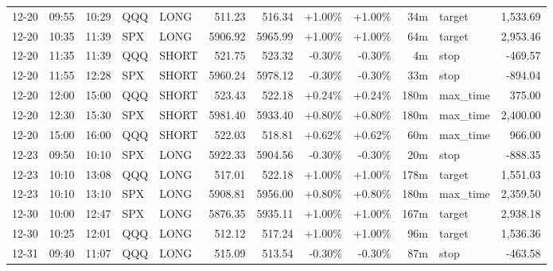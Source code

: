 \documentclass[11pt,a4paper,twoside]{article}
\begin{document}
\begin{center}
\begin{longtable}{>{\color{txtmain}}l l l l l r r r r r >{\color{txtmain}}l r}
12-20 & 09:55 & 10:29 & QQQ & LONG & 511.23 & 516.34 & \textcolor{wingreen}{+1.00\%} & \textcolor{wingreen}{+1.00\%} & 34m & target & \textcolor{wingreen}{1,533.69} \\
12-20 & 10:35 & 11:39 & SPX & LONG & 5906.92 & 5965.99 & \textcolor{wingreen}{+1.00\%} & \textcolor{wingreen}{+1.00\%} & 64m & target & \textcolor{wingreen}{2,953.46} \\
12-20 & 11:35 & 11:39 & QQQ & SHORT & 521.75 & 523.32 & \textcolor{lossred}{-0.30\%} & \textcolor{lossred}{-0.30\%} & 4m & stop & \textcolor{lossred}{-469.57} \\
12-20 & 11:55 & 12:28 & SPX & SHORT & 5960.24 & 5978.12 & \textcolor{lossred}{-0.30\%} & \textcolor{lossred}{-0.30\%} & 33m & stop & \textcolor{lossred}{-894.04} \\
12-20 & 12:00 & 15:00 & QQQ & SHORT & 523.43 & 522.18 & \textcolor{wingreen}{+0.24\%} & \textcolor{wingreen}{+0.24\%} & 180m & max\_time & \textcolor{wingreen}{375.00} \\
12-20 & 12:30 & 15:30 & SPX & SHORT & 5981.40 & 5933.40 & \textcolor{wingreen}{+0.80\%} & \textcolor{wingreen}{+0.80\%} & 180m & max\_time & \textcolor{wingreen}{2,400.00} \\
12-20 & 15:00 & 16:00 & QQQ & SHORT & 522.03 & 518.81 & \textcolor{wingreen}{+0.62\%} & \textcolor{wingreen}{+0.62\%} & 60m & max\_time & \textcolor{wingreen}{966.00} \\
12-23 & 09:50 & 10:10 & SPX & LONG & 5922.33 & 5904.56 & \textcolor{lossred}{-0.30\%} & \textcolor{lossred}{-0.30\%} & 20m & stop & \textcolor{lossred}{-888.35} \\
12-23 & 10:10 & 13:08 & QQQ & LONG & 517.01 & 522.18 & \textcolor{wingreen}{+1.00\%} & \textcolor{wingreen}{+1.00\%} & 178m & target & \textcolor{wingreen}{1,551.03} \\
12-23 & 10:10 & 13:10 & SPX & LONG & 5908.81 & 5956.00 & \textcolor{wingreen}{+0.80\%} & \textcolor{wingreen}{+0.80\%} & 180m & max\_time & \textcolor{wingreen}{2,359.50} \\
12-30 & 10:00 & 12:47 & SPX & LONG & 5876.35 & 5935.11 & \textcolor{wingreen}{+1.00\%} & \textcolor{wingreen}{+1.00\%} & 167m & target & \textcolor{wingreen}{2,938.18} \\
12-30 & 10:25 & 12:01 & QQQ & LONG & 512.12 & 517.24 & \textcolor{wingreen}{+1.00\%} & \textcolor{wingreen}{+1.00\%} & 96m & target & \textcolor{wingreen}{1,536.36} \\
12-31 & 09:40 & 11:07 & QQQ & LONG & 515.09 & 513.54 & \textcolor{lossred}{-0.30\%} & \textcolor{lossred}{-0.30\%} & 87m & stop & \textcolor{lossred}{-463.58} \\

\end{longtable}
\end{center}
\end{document}
